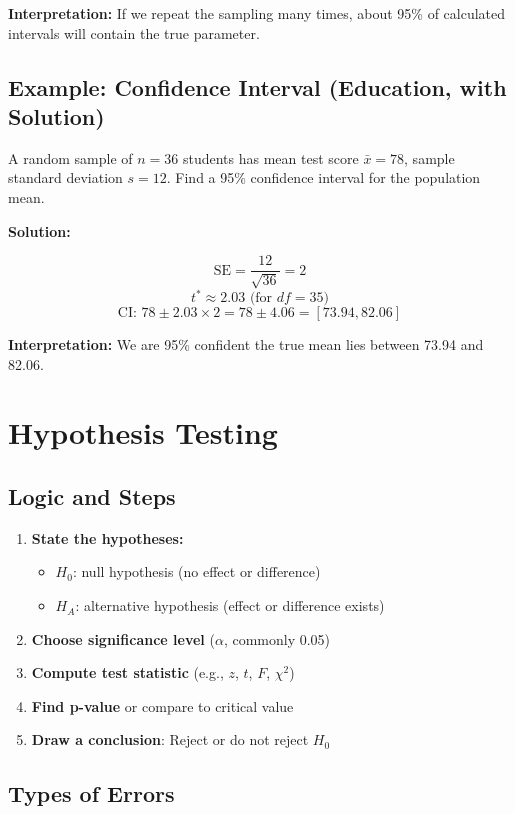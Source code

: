 \documentclass[11pt]{article}
\begin{document}
\textbf{Interpretation:} If we repeat the sampling many times, about 95\% of calculated intervals will contain the true parameter.

\subsection*{Example: Confidence Interval (Education, with Solution)}

A random sample of $n=36$ students has mean test score $\bar{x}=78$, sample standard deviation $s=12$. Find a 95\% confidence interval for the population mean.

\textbf{Solution:}

\[
\text{SE} = \frac{12}{\sqrt{36}} = 2
\]
\[
t^* \approx 2.03 \text{ (for } df=35)
\]
\[
\text{CI: } 78 \pm 2.03 \times 2 = 78 \pm 4.06 = [73.94, 82.06]
\]

\textbf{Interpretation:} We are 95\% confident the true mean lies between 73.94 and 82.06.

\section{Hypothesis Testing}

\subsection{Logic and Steps}

\begin{enumerate}
    \item \textbf{State the hypotheses:}
        \begin{itemize}
            \item $H_0$: null hypothesis (no effect or difference)
            \item $H_A$: alternative hypothesis (effect or difference exists)
        \end{itemize}
    \item \textbf{Choose significance level} ($\alpha$, commonly 0.05)
    \item \textbf{Compute test statistic} (e.g., $z$, $t$, $F$, $\chi^2$)
    \item \textbf{Find p-value} or compare to critical value
    \item \textbf{Draw a conclusion}: Reject or do not reject $H_0$
\end{enumerate}

\subsection{Types of Errors}
\end{document}

